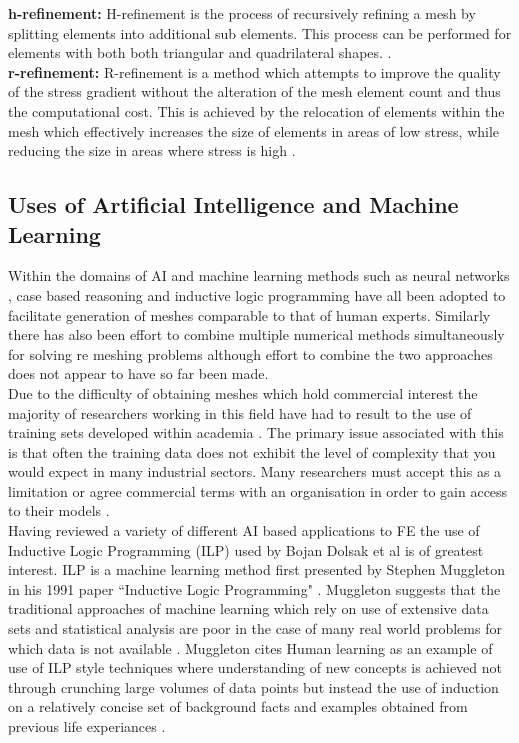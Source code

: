 \documentclass{article}
\begin{document}
\noindent
\textbf{h-refinement: }
H-refinement is the process of recursively refining a mesh by splitting elements into additional sub elements. This process can be performed for elements with both both triangular and quadrilateral shapes. \cite{HandPRefinements}. \\ 

\noindent
\textbf{r-refinement: }
R-refinement is a method which attempts to improve the quality of the stress gradient without the alteration of the mesh element count and thus the computational cost. This is achieved by the relocation of elements within the mesh which effectively increases the size of elements in areas of low stress, while reducing the size in areas where stress is high \cite{RRefinement}.


\subsection{Uses of Artificial Intelligence and Machine Learning}

\noindent
Within the domains of AI and machine learning methods such as neural networks \cite{NeuralNetworks}, case based reasoning \cite{caseBasedReasoning} and inductive logic programming \cite{DolsakPaper94} have all been adopted to facilitate generation of meshes comparable to that of human experts.  Similarly there has also been effort to combine multiple numerical methods simultaneously for solving re meshing problems \cite{TraditionalHybridRefinement} although effort to combine the two approaches does not appear to have so far been made.\\ 

\noindent
Due to the difficulty of obtaining meshes which hold commercial interest the majority of researchers working in this field have had to result to the use of training sets developed within academia \cite{DolsakPaper91}. The primary issue associated with this is that often the training data does not exhibit the level of complexity that you would expect in many industrial sectors. Many researchers must accept this as a limitation or agree commercial terms with an organisation in order to gain access to their models \cite{DittmerMeshQualityMet}.\\ 

\noindent
Having reviewed a variety of different AI based applications to FE the use of Inductive Logic Programming (ILP) used by Bojan Dolsak et al is of greatest interest. ILP is a machine learning method first presented by Stephen Muggleton in his 1991 paper ``Inductive Logic Programming" \cite{MuggletonILP}. Muggleton suggests that the traditional approaches of machine learning which rely on use of extensive data sets and statistical analysis are poor in the case of many real world problems for which data is not available \cite{ILPYoutubeLecture}. Muggleton cites Human learning as an example of use of ILP style techniques where understanding of new concepts is achieved not through crunching large volumes of data points but instead  the use of induction on a relatively concise set of background facts and examples obtained from previous life experiances \cite{ILPYoutubeLecture}. \\ 
\end{document}
